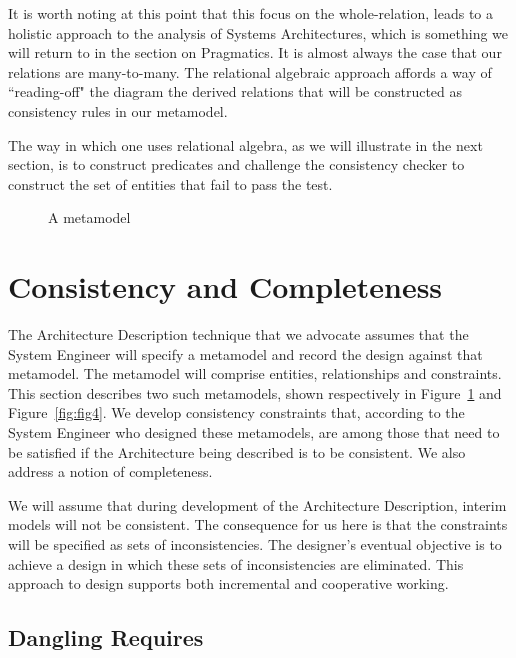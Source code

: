 \documentclass{llncs}
\begin{document}
It is worth noting at this point that this focus on the whole-relation, leads to a holistic approach to the analysis of Systems Architectures, which is something we will return to in the section on Pragmatics. It is almost always the case that our relations are many-to-many. The relational algebraic approach affords a way of ``reading-off" the diagram the derived relations that will be constructed as consistency rules in our metamodel.

The way in which one uses relational algebra, as we will illustrate in the next section, is to construct predicates and challenge the consistency checker to construct the set of entities that fail to pass the test. 
%
\begin{figure}[t]
  \centering
   {}
  \caption{A metamodel}
  \label{fig:fig3}
\end{figure}
%

\section{Consistency and Completeness}
\label{sec:consistency}
\noindent The Architecture Description technique that we advocate assumes that the System Engineer will specify a metamodel and record the design against that metamodel. The metamodel will comprise entities, relationships and constraints. This section describes two such metamodels, shown respectively in Figure~\ref{fig:fig3} and Figure~\ref{fig:fig4}. We develop consistency constraints that, according to the System Engineer who designed these metamodels, are among those that need to be satisfied if the Architecture being described is to be consistent. We also address a notion of completeness.

We will assume that during development of the Architecture Description, interim models will not be consistent. The consequence for us here is that the constraints will be specified as sets of inconsistencies. The designer's eventual objective is to achieve a design in which these sets of inconsistencies are eliminated. This approach to design supports both incremental and cooperative working.


\subsection{Dangling Requires}
\end{document}
